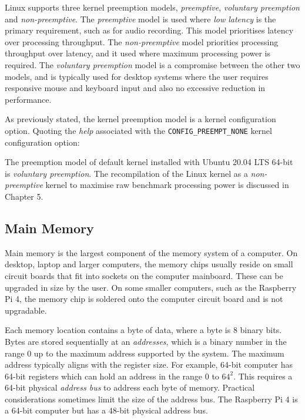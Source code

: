 Linux supports three kernel preemption models, \emph{preemptive}, \emph{voluntary preemption} and \emph{non-preemptive}. The \emph{preemptive} model is used where \emph{low latency} is the primary requirement, such as for audio recording. This model prioritises latency over processing throughput. The \emph{non-preemptive} model priorities processing throughput over latency, and it used where maximum processing power is required. The \emph{voluntary preemption} model is a compromise between the other two models, and is typically used for desktop systems where the user requires responsive mouse and keyboard input and also no excessive reduction in performance.

As previously stated, the kernel preemption model is a kernel configuration option. Quoting the \emph{help} associated with the \verb|CONFIG_PREEMPT_NONE| kernel configuration option:


The preemption model of default kernel installed with Ubuntu 20.04 LTS 64-bit is \emph{voluntary preemption}. The recompilation of the Linux kernel as a \emph{non-preemptive} kernel to maximise raw benchmark processing power is discussed in Chapter 5.  


\subsection{Main Memory}

Main memory is the largest component of the memory system of a computer. On desktop, laptop and larger computers, the memory chips usually reside on small circuit boards that fit into sockets on the computer mainboard. These can be upgraded in size by the user. On some smaller computers, such as the Raspberry Pi 4, the memory chip is soldered onto the computer circuit board and is not upgradable.

Each memory location contains a byte of data, where a byte is 8 binary bits. Bytes are stored sequentially at an \emph{addresses}, which is a binary number in the range 0 up to the maximum address supported by the system. The maximum address typically aligns with the register size. For example, 64-bit computer has 64-bit registers which can hold an address in the range 0 to $64^2$. This requires a 64-bit physical \emph{address bus} to address each byte of memory. Practical considerations sometimes limit the size of the address bus. The Raspberry Pi 4 is a 64-bit computer but has a 48-bit physical address bus.

